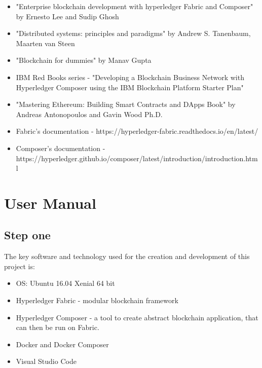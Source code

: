 \documentclass[a4paper,11pt]{report}
\begin{document}
\begin{itemize}
	\item "Enterprise blockchain development with hyperledger Fabric and Composer" by Ernesto Lee and Sudip Ghosh
	\item "Distributed systems: principles and paradigms" by Andrew S. Tanenbaum, Maarten van Steen
	\item "Blockchain for dummies" by Manav Gupta 
	\item IBM Red Books series - "Developing a Blockchain Business Network with Hyperledger Composer using the IBM Blockchain Platform Starter Plan" 
	\item "Mastering Ethereum: Building Smart Contracts and DApps Book" by Andreas Antonopoulos and Gavin Wood Ph.D.
	\item Fabric's documentation - https://hyperledger-fabric.readthedocs.io/en/latest/
	\item Composer's documentation - https://hyperledger.github.io/composer/latest/introduction/introduction.html
\end{itemize}






\appendix

\chapter{User Manual}
\label{usermanual}


\section{Step one}
\label{stepOne}
	 
The key software and technology used for the creation and development of this project is:
\begin{itemize}
\item OS: Ubuntu 16.04 Xenial 64 bit
\item Hyperledger Fabric - modular blockchain framework
\item Hyperledger Composer - a tool to create abstract blockchain application, that can then be run on Fabric.
\item Docker and Docker Composer
\item Visual Studio Code
\end{itemize}
\end{document}
